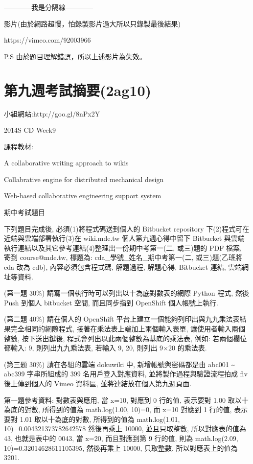 \documentclass[]{article}
\begin{document}
------------我是分隔線------------

影片(由於網路超慢，怕錄製影片過大所以只錄製最後結果)

https://vimeo.com/92003966

P.S 由於題目理解錯誤，所以上述影片為失效。

\section{第九週考試摘要(2ag10)}\label{ux7b2cux4e5dux9031ux8003ux8a66ux6458ux89812ag10}

小組網站:http://goo.gl/8nPx2Y

2014S CD Week9

課程教材:

A collaborative writing approach to wikis

Collabrative engine for distributed mechanical design

Web-based collaborative engineering support system

期中考試題目

下列題目完成後, 必須(1)將程式碼送到個人的 Bitbucket repository
下(2)程式可在近端與雲端部署執行(3)在 wiki.mde.tw 個人第九週心得中留下
Bitbucket 與雲端執行連結以及其它參考連結(4)整理出一份期中考第一(二,
或三)題的 PDF 檔案, 寄到 course@mde.tw, 標題為:
cda\_學號\_姓名\_期中考第一(二, 或三)題(乙班將 cda 改為 cdb),
內容必須包含程式碼, 解題過程, 解題心得, Bitbucket 連結, 雲端網址等資料.

(第一題 30\%) 請寫一個執行時可以列出以十為底對數表的網際 Python 程式,
然後 Push 到個人 bitbucket 空間, 而且同步指到 OpenShift 個人帳號上執行.

(第二題 40\%) 請在個人的 OpenShift
平台上建立一個能夠列印出與九九乘法表結果完全相同的網際程式,
接著在乘法表上端加上兩個輸入表單, 讓使用者輸入兩個整數, 按下送出鍵後,
程式會列出以此兩個整數為基底的乘法表, 例如: 若兩個欄位都輸入: 9,
則列出九九乘法表, 若輸入 9, 20, 則列出 9×20 的乘法表.

(第三題 30\%) 請在各組的雲端 dokuwiki 中, 新增帳號與密碼都是由 abc001
\textasciitilde{} abc399 字串所組成的 399 名用戶登入對應資料,
並將製作過程與驗證流程拍成 flv 後上傳到個人的 Vimeo 資料區,
並將連結放在個人第九週頁面.

第一題參考資料: 對數表與應用, 當 x=10, 對應到 0 行的值, 表示要對 1.00
取以十為底的對數, 所得到的值為 math.log(1.00, 10)=0, 而 x=10 對應到 1
行的值, 表示要對 1.01 取以十為底的對數, 所得到的值為 math.log(1.01,
10)=0.004321373782642578 然後再乘上 10000, 並且只取整數,
所以對應表的值為 43, 也就是表中的 0043, 當 x=20, 而且對應到第 9 行的值,
則為 math.log(2.09, 10)=0.32014628611105395, 然後再乘上 10000, 只取整數,
所以對應表上的值為 3201.
\end{document}
